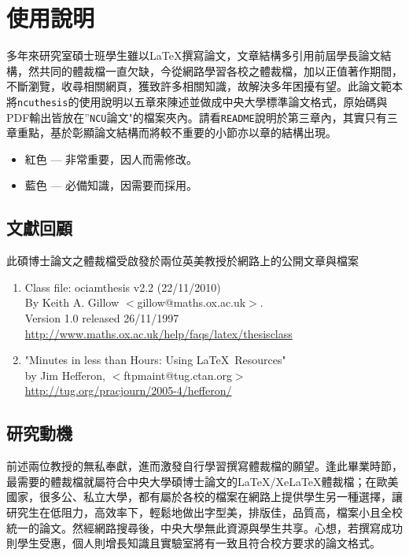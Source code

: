 \chapter{使用說明}

多年來研究室碩士班學生雖以\LaTeX 撰寫論文，文章結構多引用前屆學長論文結構，然共同的體裁檔一直欠缺，今從網路學習各校之體裁檔，加以正值著作期間，不斷瀏覽，收尋相關網頁，獲致許多相關知識，故解決多年困擾有望。此論文範本將{\tt ncuthesis}的使用說明以五章來陳述並做成中央大學標準論文格式，原始碼與PDF輸出皆放在''{\tt NCU}論文"的檔案夾內。請看{\tt README}說明於第三章內，其實只有三章重點，基於彰顯論文結構而將較不重要的小節亦以章的結構出現。
\begin{itemize}
\item {\color{red}紅色} ---  非常重要，因人而需修改。
\item {\color{blue}藍色} --- 必備知識，因需要而採用。
\end{itemize}
\section{文獻回顧}
此碩博士論文之體裁檔受啟發於兩位英美教授於網路上的公開文章與檔案
\begin{enumerate}
\item Class file: ociamthesis v2.2 (22/11/2010) \\
    By Keith A. Gillow $<$gillow@maths.ox.ac.uk$>$. \\
    Version 1.0 released 26/11/1997\\
	\url{http://www.maths.ox.ac.uk/help/faqs/latex/thesisclass}
\item "Minutes in less than Hours: Using \LaTeX\ Resources" \\
    by Jim Hefferon, $<$ftpmaint@tug.ctan.org$>$\\
	\url{http://tug.org/pracjourn/2005-4/hefferon/}
\end{enumerate}

\section{研究動機}
前述兩位教授的無私奉獻，進而激發自行學習撰寫體裁檔的願望。逢此畢業時節，最需要的體裁檔就屬符合中央大學碩博士論文的\LaTeX{}/Xe\LaTeX{}體裁檔；在歐美國家，很多公、私立大學，都有屬於各校的檔案在網路上提供學生另一種選擇，讓研究生在低阻力，高效率下，輕鬆地做出字型美，排版佳，品質高，檔案小且全校統一的論文。然經網路搜尋後，中央大學無此資源與學生共享。心想，若撰寫成功則學生受惠，個人則增長知識且實驗室將有一致且符合校方要求的論文格式。

